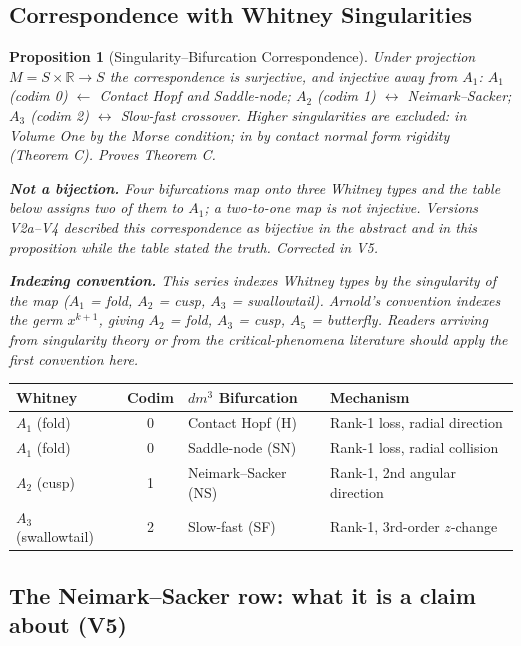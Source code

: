 \documentclass[11pt]{article}
\theoremstyle{boxed}
\newtheorem{proposition}[theorem]{Proposition}
\begin{document}
\subsection{Correspondence with Whitney Singularities}

\begin{proposition}[Singularity--Bifurcation Correspondence]
Under projection $M = S \times \mathbb{R} \to S$ the correspondence is \emph{surjective},
and injective away from $A_1$:
$A_1$ (codim 0) $\leftarrow$ Contact Hopf \emph{and} Saddle-node;
$A_2$ (codim 1) $\leftrightarrow$ Neimark--Sacker;
$A_3$ (codim 2) $\leftrightarrow$ Slow-fast crossover. Higher singularities are excluded:
in Volume One by the Morse condition; in \cite{GCM} by contact normal form rigidity
(Theorem C). Proves Theorem C.

\smallskip
\noindent\textbf{Not a bijection.} Four bifurcations map onto three Whitney types and the table
below assigns two of them to $A_1$; a two-to-one map is not injective. Versions V2a--V4 described
this correspondence as bijective in the abstract and in this proposition while the table stated the
truth. Corrected in V5.

\smallskip
\noindent\textbf{Indexing convention.} This series indexes Whitney types by the singularity of the
map ($A_1$ = fold, $A_2$ = cusp, $A_3$ = swallowtail). Arnold's convention indexes the germ
$x^{k+1}$, giving $A_2$ = fold, $A_3$ = cusp, $A_5$ = butterfly. Readers arriving from singularity
theory or from the critical-phenomena literature should apply the first convention here.
\end{proposition}

\begin{center}
\begin{tabular}{lcll}
\toprule
\textbf{Whitney} & \textbf{Codim} & \textbf{$dm^3$ Bifurcation} & \textbf{Mechanism}\\
\midrule
$A_1$ (fold) & 0 & Contact Hopf (H) & Rank-1 loss, radial direction\\
$A_1$ (fold) & 0 & Saddle-node (SN) & Rank-1 loss, radial collision\\
$A_2$ (cusp) & 1 & Neimark--Sacker (NS) & Rank-1, 2nd angular direction\\
$A_3$ (swallowtail) & 2 & Slow-fast (SF) & Rank-1, 3rd-order $z$-change\\
\bottomrule
\end{tabular}
\end{center}

\subsection{The Neimark--Sacker row: what it is a claim about (V5)}
\end{document}
